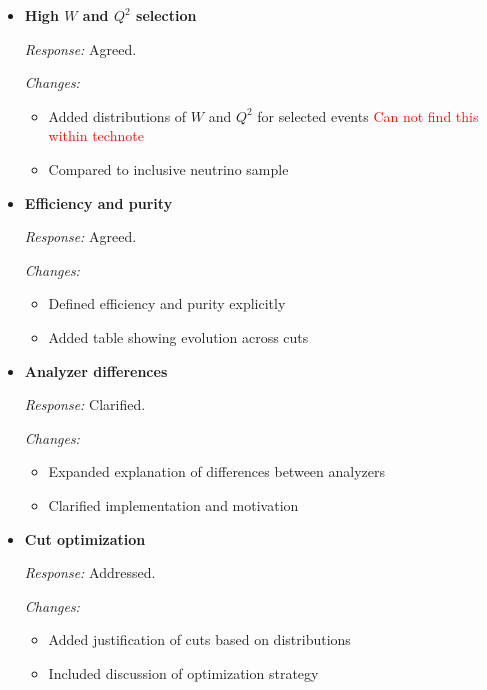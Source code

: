 \documentclass[11pt]{article}
\begin{document}
\begin{itemize}[leftmargin=*]
\textit{Response:} Added.

\textit{Changes:}
\begin{itemize}
\item Documented GENIE version and tune used in simulation \textcolor{red}{Do not see version mentioned within the note}
\end{itemize}

\item \textbf{High $W$ and $Q^2$ selection}

\textit{Response:} Agreed.

\textit{Changes:}
\begin{itemize}
\item Added distributions of $W$ and $Q^2$ for selected events \textcolor{red}{Can not find this within technote}
\item Compared to inclusive neutrino sample
\end{itemize}

\item \textbf{Efficiency and purity}

\textit{Response:} Agreed.

\textit{Changes:}
\begin{itemize}
\item Defined efficiency and purity explicitly
\item Added table showing evolution across cuts
\end{itemize}

\item \textbf{Analyzer differences}

\textit{Response:} Clarified.

\textit{Changes:}
\begin{itemize}
\item Expanded explanation of differences between analyzers
\item Clarified implementation and motivation
\end{itemize}

\item \textbf{Cut optimization}

\textit{Response:} Addressed.

\textit{Changes:}
\begin{itemize}
\item Added justification of cuts based on distributions
\item Included discussion of optimization strategy
\end{itemize}


\end{itemize}
\end{document}
